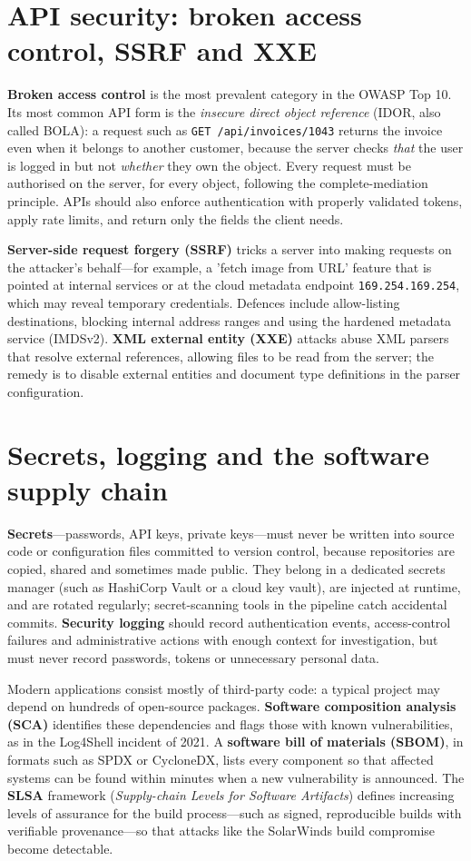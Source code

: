 \documentclass[11pt,openany]{book}
\begin{document}
\section{API security: broken access control, SSRF and XXE}\label{sec:9.5}
\textbf{Broken access control} is the most prevalent category in the OWASP Top 10. Its most common API form is the \emph{insecure direct object reference} (IDOR, also called BOLA): a request such as \texttt{GET /api/invoices/1043} returns the invoice even when it belongs to another customer, because the server checks \emph{that} the user is logged in but not \emph{whether} they own the object. Every request must be authorised on the server, for every object, following the complete-mediation principle. APIs should also enforce authentication with properly validated tokens, apply rate limits, and return only the fields the client needs.

\textbf{Server-side request forgery (SSRF)} tricks a server into making requests on the attacker's behalf—for example, a 'fetch image from URL' feature that is pointed at internal services or at the cloud metadata endpoint \texttt{169.254.169.254}, which may reveal temporary credentials. Defences include allow-listing destinations, blocking internal address ranges and using the hardened metadata service (IMDSv2). \textbf{XML external entity (XXE)} attacks abuse XML parsers that resolve external references, allowing files to be read from the server; the remedy is to disable external entities and document type definitions in the parser configuration.

\section{Secrets, logging and the software supply chain}\label{sec:9.6}
\textbf{Secrets}—passwords, API keys, private keys—must never be written into source code or configuration files committed to version control, because repositories are copied, shared and sometimes made public. They belong in a dedicated secrets manager (such as HashiCorp Vault or a cloud key vault), are injected at runtime, and are rotated regularly; secret-scanning tools in the pipeline catch accidental commits. \textbf{Security logging} should record authentication events, access-control failures and administrative actions with enough context for investigation, but must never record passwords, tokens or unnecessary personal data.

Modern applications consist mostly of third-party code: a typical project may depend on hundreds of open-source packages. \textbf{Software composition analysis (SCA)} identifies these dependencies and flags those with known vulnerabilities, as in the Log4Shell incident of 2021. A \textbf{software bill of materials (SBOM)}, in formats such as SPDX or CycloneDX, lists every component so that affected systems can be found within minutes when a new vulnerability is announced. The \textbf{SLSA} framework (\emph{Supply-chain Levels for Software Artifacts}) defines increasing levels of assurance for the build process—such as signed, reproducible builds with verifiable provenance—so that attacks like the SolarWinds build compromise become detectable.
\end{document}

